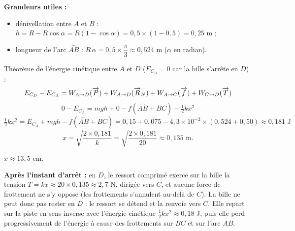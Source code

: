 \textbf{Grandeurs utiles :}
\begin{itemize}
  \item dénivellation entre $A$ et $B$ : $h = R - R\cos\alpha = R(1 - \cos\alpha) = 0,5 \times (1 - 0,5) = 0,25$ m ;
  \item longueur de l'arc $\overset{\frown}{AB}$ : $R\,\alpha = 0,5 \times \dfrac{\pi}{3} \approx 0,524$ m
        ($\alpha$ en radian).
\end{itemize}
Théorème de l'énergie cinétique entre $A$ et $D$ ($E_{C_D} = 0$ car la bille s'arrête en $D$) :
\[
E_{C_D} - E_{C_A} = W_{A \to D}(\overrightarrow{P}) + W_{A \to D}(\overrightarrow{R}_N) + W_{A \to C}(\overrightarrow{f}) + W_{C \to D}(\overrightarrow{T})
\]
\[
0 - E_{C_A} = m g h + 0 - f\left(\overset{\frown}{AB} + BC\right) - \tfrac{1}{2} k x^2
\]
\[
\tfrac{1}{2} k x^2 = E_{C_A} + m g h - f\left(\overset{\frown}{AB} + BC\right)
= 0,15 + 0,075 - 4,3 \times 10^{-2} \times (0,524 + 0,50) \approx 0,181 \text{ J}
\]
\[
x = \sqrt{\frac{2 \times 0,181}{k}} = \sqrt{\frac{2 \times 0,181}{20}} \approx 0,135 \text{ m.}
\]
\begin{resultat}
$x \approx 13,5$ cm.
\end{resultat}

\textbf{Après l'instant d'arrêt :} en $D$, le ressort comprimé exerce sur la bille la tension
$T = k x \approx 20 \times 0,135 \approx 2,7$ N, dirigée vers $C$, et aucune force de frottement ne
s'y oppose (les frottements s'annulent au-delà de $C$). La bille ne peut donc pas rester en $D$ :
le ressort se détend et la renvoie vers $C$. Elle repart sur la piste en sens inverse avec l'énergie
cinétique $\tfrac{1}{2} k x^2 \approx 0,18$ J, puis elle perd progressivement de l'énergie à cause
des frottements sur $BC$ et sur l'arc $AB$.


